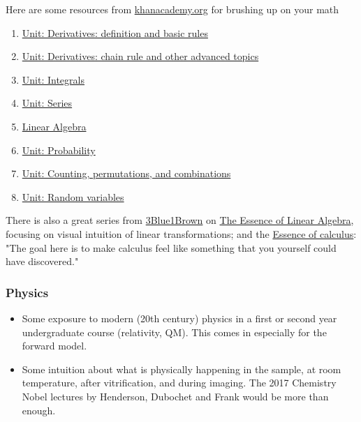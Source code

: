\documentclass[11pt, oneside]{article}   	%
\begin{document}
Here are some resources from \url{khanacademy.org} for brushing up on your math

\begin{enumerate}
	\item \href{https://www.khanacademy.org/math/differential-calculus/dc-diff-intro}{Unit: Derivatives: definition and basic rules} 
	\item \href{https://www.khanacademy.org/math/differential-calculus/dc-chain}{Unit: Derivatives: chain rule and other advanced topics}
	\item \href{https://www.khanacademy.org/math/integral-calculus/ic-integration} {Unit: Integrals}
	\item \href{https://www.khanacademy.org/math/integral-calculus/ic-series}{Unit: Series}
	\item \href{https://www.khanacademy.org/math/linear-algebra}{Linear Algebra}
	\item \href{https://www.khanacademy.org/math/statistics-probability/probability-library}{Unit: Probability}
	\item \href{https://www.khanacademy.org/math/statistics-probability/counting-permutations-and-combinations}{Unit: Counting, permutations, and combinations}
	\item \href{https://www.khanacademy.org/math/statistics-probability/random-variables-stats-library}{Unit: Random variables}
\end{enumerate}

There is also a great series from \href{https://www.youtube.com/c/3blue1brown}{3Blue1Brown} on \href{https://youtube.com/playlist?list=PLZHQObOWTQDPD3MizzM2xVFitgF8hE_ab}{The Essence of Linear Algebra}, focusing on visual intuition of  linear transformations; and the \href{https://youtube.com/playlist?list=PLZHQObOWTQDMsr9K-rj53DwVRMYO3t5Yr}{Essence of calculus}: "The goal here is to make calculus feel like something that you yourself could have discovered."

\subsubsection{Physics}
\begin{itemize}
	\item Some exposure to modern (20th century) physics in a first or second year undergraduate course (relativity, QM). This comes in especially for the forward model.
	\item Some intuition about what is physically happening in the sample, at room temperature, after vitrification, and during imaging. The 2017 Chemistry Nobel lectures by Henderson, Dubochet and Frank would be more than enough.
\end{itemize}
\end{document}

